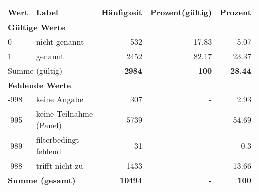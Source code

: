      \begin{longtable}{lXrrr}
     \toprule
     \textbf{Wert} & \textbf{Label} & \textbf{Häufigkeit} & \textbf{Prozent(gültig)} & \textbf{Prozent} \\
     \endhead
     \midrule
     \multicolumn{5}{l}{\textbf{Gültige Werte}}\\

     0 &
     \multicolumn{1}{X}{ nicht genannt   } &


       \num{532} &
       \num[round-mode=places,round-precision=2]{17.83} &
         \num[round-mode=places,round-precision=2]{5.07} \\

     1 &
     \multicolumn{1}{X}{ genannt   } &


       \num{2452} &
       \num[round-mode=places,round-precision=2]{82.17} &
         \num[round-mode=places,round-precision=2]{23.37} \\
     \midrule
     \multicolumn{2}{l}{Summe (gültig)} &
       \textbf{\num{2984}} &
     \textbf{\num{100}} &
       \textbf{\num[round-mode=places,round-precision=2]{28.44}} \\
     \multicolumn{5}{l}{\textbf{Fehlende Werte}}\\
       -998 &
       keine Angabe &
         \num{307} &
        - &
         \num[round-mode=places,round-precision=2]{2.93} \\
       -995 &
       keine Teilnahme (Panel) &
         \num{5739} &
        - &
         \num[round-mode=places,round-precision=2]{54.69} \\
       -989 &
       filterbedingt fehlend &
         \num{31} &
        - &
         \num[round-mode=places,round-precision=2]{0.3} \\
       -988 &
       trifft nicht zu &
         \num{1433} &
        - &
         \num[round-mode=places,round-precision=2]{13.66} \\
     \midrule
     \multicolumn{2}{l}{\textbf{Summe (gesamt)}} &
          \textbf{\num{10494}} &
        \textbf{-} &
        \textbf{\num{100}} \\
     \bottomrule
     \end{longtable}
     
